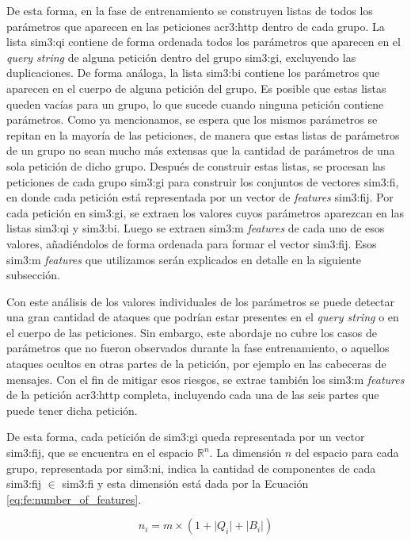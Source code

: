 De esta forma, en la fase de entrenamiento se construyen listas de todos
los parámetros que aparecen en las peticiones \gls{acr3:http} dentro
de cada grupo. La lista \gls{sim3:qi} contiene de forma ordenada todos
los parámetros que aparecen en el \textit{query string} de alguna
petición dentro del grupo \gls{sim3:gi}, excluyendo las duplicaciones.
De forma análoga, la lista \gls{sim3:bi} contiene los parámetros que
aparecen en el cuerpo de alguna petición del grupo.
Es posible que estas listas queden vacías para un grupo, lo que sucede
cuando ninguna petición contiene parámetros.
Como ya mencionamos, se espera que los mismos parámetros se repitan en la
mayoría de las peticiones, de manera que estas listas de parámetros de un
grupo no sean mucho más extensas que la cantidad de parámetros de una sola
petición de dicho grupo.
Después de construir estas listas, se procesan las peticiones de cada
grupo \gls{sim3:gi} para construir los conjuntos de vectores \gls{sim3:fi},
en donde cada petición está representada por un vector de \textit{features}
\gls{sim3:fij}.
Por cada petición en \gls{sim3:gi}, se extraen los valores cuyos parámetros
aparezcan en las listas \gls{sim3:qi} y \gls{sim3:bi}. Luego se extraen
\gls{sim3:m} \textit{features} de cada uno de esos valores, añadiéndolos
de forma ordenada para formar el vector \gls{sim3:fij}. Esos \gls{sim3:m}
\textit{features} que utilizamos serán explicados en detalle en la
siguiente subsección.

Con este análisis de los valores individuales de los parámetros se puede
detectar una gran cantidad de ataques que podrían estar presentes en el
\textit{query string} o en el cuerpo de las peticiones. Sin embargo, este
abordaje no cubre los casos de parámetros que no fueron observados durante
la fase entrenamiento, o aquellos ataques ocultos en otras partes de la
petición, por ejemplo en las cabeceras de mensajes.
Con el fin de mitigar esos riesgos, se extrae también los \gls{sim3:m}
\textit{features} de la petición \gls{acr3:http} completa, incluyendo
cada una de las seis partes que puede tener dicha petición.

De esta forma, cada petición de \gls{sim3:gi} queda representada por un
vector \gls{sim3:fij}, que se encuentra en el espacio $\mathbb{R}^{n}$.
La dimensión $n$ del espacio para cada grupo,
representada por \gls{sim3:ni}, indica la cantidad de componentes de cada
\gls{sim3:fij} $\in$ \gls{sim3:fi} y esta dimensión está dada por la
Ecuación \ref{eq:fe:number_of_features}.

\begin{equation}
    \label{eq:fe:number_of_features}
    n_{i}
    =
    m
    \times
    \left(
        1 + \lvert Q_{i} \rvert + \lvert B_{i} \rvert
    \right)
\end{equation}

